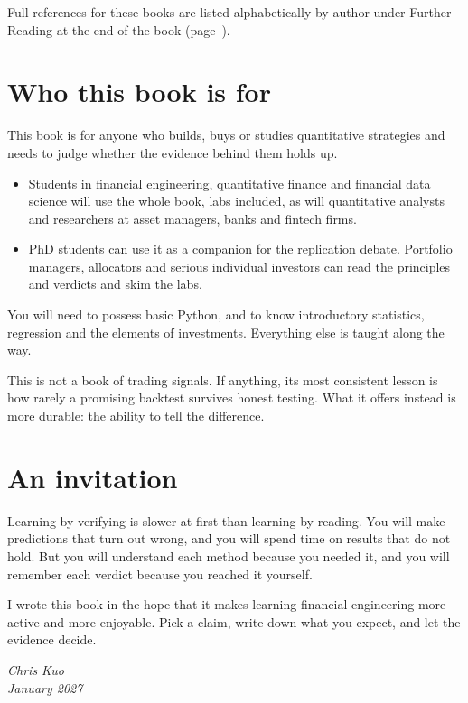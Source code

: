 Full references for these books are listed alphabetically by author under Further Reading at the end of the book (page~\pageref{furtherreading}).


\section*{Who this book is for}

This book is for anyone who builds, buys or studies quantitative strategies and needs to judge whether the evidence behind them holds up.

\begin{itemize}
  \item Students in financial engineering, quantitative finance and financial data science will use the whole book, labs included, as will quantitative analysts and researchers at asset managers, banks and fintech firms.
  \item PhD students can use it as a companion for the replication debate. Portfolio managers, allocators and serious individual investors can read the principles and verdicts and skim the labs.
\end{itemize}

You will need to possess basic Python, and to know introductory statistics, regression and the elements of investments. Everything else is taught along the way.

This is not a book of trading signals. If anything, its most consistent lesson is how rarely a promising backtest survives honest testing. What it offers instead is more durable: the ability to tell the difference.

\section*{An invitation}

Learning by verifying is slower at first than learning by reading. You will make predictions that turn out wrong, and you will spend time on results that do not hold. But you will understand each method because you needed it, and you will remember each verdict because you reached it yourself.

I wrote this book in the hope that it makes learning financial engineering more active and more enjoyable. Pick a claim, write down what you expect, and let the evidence decide.

\bigskip
\begin{flushright}
\emph{Chris Kuo}\\
\emph{January 2027}
\end{flushright}
